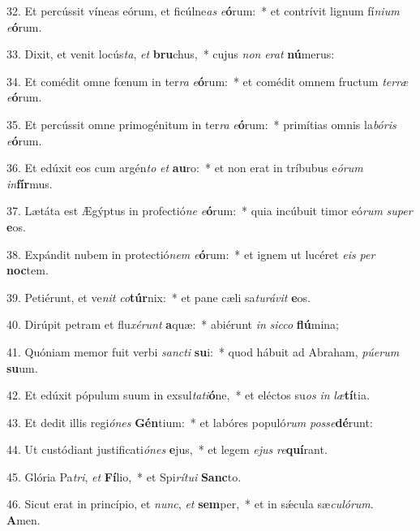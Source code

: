 32. Et percússit víneas eórum, et ficúlne\textit{as} \textit{e}\textbf{ó}rum:~*  et contrívit lignum fí\textit{ni}\textit{um} \textit{e}\textbf{ó}rum.\

33. Dixit, et venit locús\textit{ta}, \textit{et} \textbf{bru}chus,~*  cujus \textit{non} \textit{e}\textit{rat} \textbf{nú}merus:\

34. Et comédit omne fœnum in ter\textit{ra} \textit{e}\textbf{ó}rum:~*  et comédit omnem fructum \textit{ter}\textit{ræ} \textit{e}\textbf{ó}rum.\

35. Et percússit omne primogénitum in ter\textit{ra} \textit{e}\textbf{ó}rum:~*  primítias omnis la\textit{bó}\textit{ris} \textit{e}\textbf{ó}rum.\

36. Et edúxit eos cum argén\textit{to} \textit{et} \textbf{au}ro:~*  et non erat in tríbubus e\textit{ó}\textit{rum} \textit{in}\textbf{fír}mus.\

37. Lætáta est Ægýptus in profectió\textit{ne} \textit{e}\textbf{ó}rum:~*  quia incúbuit timor eó\textit{rum} \textit{su}\textit{per} \textbf{e}os.\

38. Expándit nubem in protectió\textit{nem} \textit{e}\textbf{ó}rum:~*  et ignem ut lucéret \textit{e}\textit{is} \textit{per} \textbf{noc}tem.\

39. Petiérunt, et ve\textit{nit} \textit{co}\textbf{túr}nix:~*  et pane cæli sa\textit{tu}\textit{rá}\textit{vit} \textbf{e}os.\

40. Dirúpit petram et flu\textit{xé}\textit{runt} \textbf{a}quæ:~*  abiérunt \textit{in} \textit{sic}\textit{co} \textbf{flú}mina;\

41. Quóniam memor fuit verbi \textit{sanc}\textit{ti} \textbf{su}i:~*  quod hábuit ad Abraham, \textit{pú}\textit{e}\textit{rum} \textbf{su}um.\

42. Et edúxit pópulum suum in exsul\textit{ta}\textit{ti}\textbf{ó}ne,~*  et eléctos su\textit{os} \textit{in} \textit{læ}\textbf{tí}tia.\

43. Et dedit illis regi\textit{ó}\textit{nes} \textbf{Gén}tium:~*  et labóres populó\textit{rum} \textit{pos}\textit{se}\textbf{dé}runt:\

44. Ut custódiant justificati\textit{ó}\textit{nes} \textbf{e}jus,~*  et legem \textit{e}\textit{jus} \textit{re}\textbf{quí}rant.\

45. Glória Pa\textit{tri}, \textit{et} \textbf{Fí}lio,~*  et Spi\textit{rí}\textit{tu}\textit{i} \textbf{Sanc}to.\

46. Sicut erat in princípio, et \textit{nunc}, \textit{et} \textbf{sem}per,~*  et in sǽcula sæ\textit{cu}\textit{ló}\textit{rum}. \textbf{A}men.\

